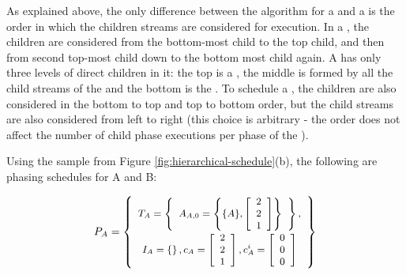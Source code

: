 As explained above, the only difference between the algorithm for
a {\pipeline} and a {\splitjoin} is the order in which the children
streams are considered for execution.  In a {\pipeline}, the
children are considered from the bottom-most child to the top
child, and then from second top-most child down to the bottom most
child again.  A {\splitjoin} has only three levels of direct
children in it: the top is a {\splitter}, the middle is formed by
all the child streams of the {\splitjoin} and the bottom is the
{\joiner}.  To schedule a {\splitjoin}, the children are also
considered in the bottom to top and top to bottom order, but the
child streams are also considered from left to right (this choice
is arbitrary - the order does not affect the number of child phase
executions per phase of the {\splitjoin}).

Using the sample {\splitjoin} from Figure
\ref{fig:hierarchical-schedule}(b), the following are phasing
schedules for {\filters} A and B:

\begin{displaymath} \small
P_A = \left\{
\begin{array}{c}
T_A = \left\{
\begin{array}{c}
A_{A,0} = \left\{ \{A\}, \left[\begin{array}{c} 2 \\ 2 \\ 1 \end{array}\right]\right\} \\
\end{array}\right\}, \\
I_A = \left\{ \right\}, c_A = \left[ \begin{array}{c} 2 \\ 2 \\ 1
\end{array} \right], c^i_A = \left[ \begin{array}{c} 0 \\ 0 \\ 0
\end{array} \right]
\end{array}
\right\}
\end{displaymath}

